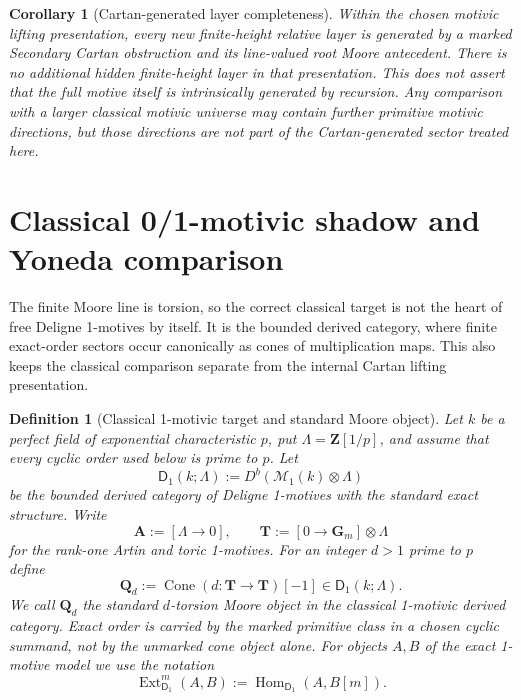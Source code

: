\documentclass[11pt]{article}
\newtheorem{corollary}[theorem]{Corollary}
\newtheorem{definition}[theorem]{Definition}
\theoremstyle{remark}
\begin{document}
\begin{corollary}[Cartan-generated layer completeness]
\label{cor:cartan-generated-layer-completeness}
Within the chosen motivic lifting presentation, every new finite-height relative layer
is generated by a marked Secondary Cartan obstruction and its
line-valued root Moore antecedent.  There is no additional hidden finite-height layer in
that presentation.  This does not assert that the full motive itself is intrinsically
generated by recursion.  Any comparison with a larger classical motivic universe may
contain further primitive motivic directions, but those directions are not part of the
Cartan-generated sector treated here.
\end{corollary}

\section{Classical 0/1-motivic shadow and Yoneda comparison}
\label{sec:classical-one-motive-comparison}

The finite Moore line is torsion, so the correct classical target is not the heart of
free Deligne 1-motives by itself.  It is the bounded derived category, where finite
exact-order sectors occur canonically as cones of multiplication maps.  This also keeps
the classical comparison separate from the internal Cartan lifting presentation.

\begin{definition}[Classical 1-motivic target and standard Moore object]
\label{def:classical-one-motivic-target}
Let $k$ be a perfect field of exponential characteristic $p$, put
$\Lambda=\mathbf Z[1/p]$, and assume that every cyclic order used below is prime to $p$.
Let
\[
 \mathsf D_1(k;\Lambda):=D^b(\mathcal M_1(k)\otimes\Lambda)
\]
be the bounded derived category of Deligne 1-motives with the standard exact structure.
Write
\[
 \mathbf A:=[\Lambda\longrightarrow0],
 \qquad
 \mathbf T:=[0\longrightarrow\mathbf G_m]\otimes\Lambda
\]
for the rank-one Artin and toric 1-motives.  For an integer $d>1$ prime to $p$ define
\begin{equation}\label{eq:classical-torsion-moore-object}
 \boxed{
 \mathbf Q_d
 :=\operatorname{Cone}\!\left(
 d:\mathbf T\longrightarrow\mathbf T
 \right)[-1]\in\mathsf D_1(k;\Lambda).}
\end{equation}
We call $\mathbf Q_d$ the standard $d$-torsion Moore object in the classical
1-motivic derived category.  Exact order is carried by the marked primitive class in a
chosen cyclic summand, not by the unmarked cone object alone.  For objects $A,B$ of the
exact 1-motive model we use the notation
\[
 \operatorname{Ext}^m_{\mathsf D_1}(A,B)
 :=\operatorname{Hom}_{\mathsf D_1}(A,B[m]).
\]
\end{definition}
\end{document}
